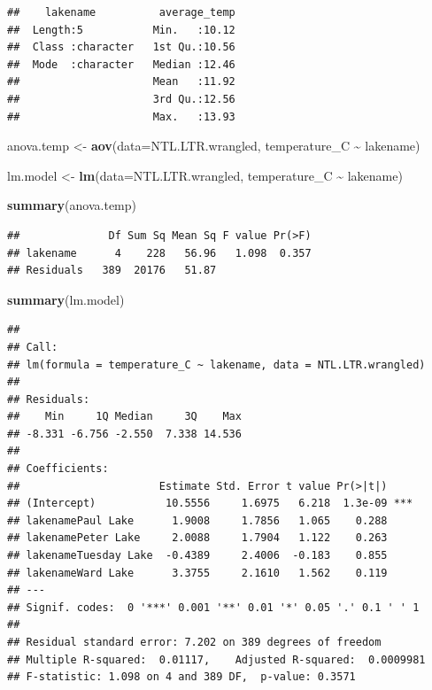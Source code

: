 \documentclass[
]{article}
\newenvironment{Shaded}{\begin{snugshade}}{\end{snugshade}}
\newcommand{\AttributeTok}[1]{\textcolor[rgb]{0.13,0.29,0.53}{#1}}
\newcommand{\FunctionTok}[1]{\textcolor[rgb]{0.13,0.29,0.53}{\textbf{#1}}}
\newcommand{\NormalTok}[1]{#1}
\newcommand{\OtherTok}[1]{\textcolor[rgb]{0.56,0.35,0.01}{#1}}
\newcommand{\SpecialCharTok}[1]{\textcolor[rgb]{0.81,0.36,0.00}{\textbf{#1}}}
\begin{document}
\begin{verbatim}
##    lakename          average_temp  
##  Length:5           Min.   :10.12  
##  Class :character   1st Qu.:10.56  
##  Mode  :character   Median :12.46  
##                     Mean   :11.92  
##                     3rd Qu.:12.56  
##                     Max.   :13.93
\end{verbatim}

\begin{Shaded}
\begin{Highlighting}[]
\NormalTok{anova.temp }\OtherTok{\textless{}{-}} \FunctionTok{aov}\NormalTok{(}\AttributeTok{data=}\NormalTok{NTL.LTR.wrangled, temperature\_C }\SpecialCharTok{\textasciitilde{}}\NormalTok{ lakename)}

\NormalTok{lm.model }\OtherTok{\textless{}{-}} \FunctionTok{lm}\NormalTok{(}\AttributeTok{data=}\NormalTok{NTL.LTR.wrangled, temperature\_C }\SpecialCharTok{\textasciitilde{}}\NormalTok{ lakename)}

\FunctionTok{summary}\NormalTok{(anova.temp)}
\end{Highlighting}
\end{Shaded}

\begin{verbatim}
##              Df Sum Sq Mean Sq F value Pr(>F)
## lakename      4    228   56.96   1.098  0.357
## Residuals   389  20176   51.87
\end{verbatim}

\begin{Shaded}
\begin{Highlighting}[]
\FunctionTok{summary}\NormalTok{(lm.model)}
\end{Highlighting}
\end{Shaded}

\begin{verbatim}
## 
## Call:
## lm(formula = temperature_C ~ lakename, data = NTL.LTR.wrangled)
## 
## Residuals:
##    Min     1Q Median     3Q    Max 
## -8.331 -6.756 -2.550  7.338 14.536 
## 
## Coefficients:
##                      Estimate Std. Error t value Pr(>|t|)    
## (Intercept)           10.5556     1.6975   6.218  1.3e-09 ***
## lakenamePaul Lake      1.9008     1.7856   1.065    0.288    
## lakenamePeter Lake     2.0088     1.7904   1.122    0.263    
## lakenameTuesday Lake  -0.4389     2.4006  -0.183    0.855    
## lakenameWard Lake      3.3755     2.1610   1.562    0.119    
## ---
## Signif. codes:  0 '***' 0.001 '**' 0.01 '*' 0.05 '.' 0.1 ' ' 1
## 
## Residual standard error: 7.202 on 389 degrees of freedom
## Multiple R-squared:  0.01117,    Adjusted R-squared:  0.0009981 
## F-statistic: 1.098 on 4 and 389 DF,  p-value: 0.3571
\end{verbatim}
\end{document}
